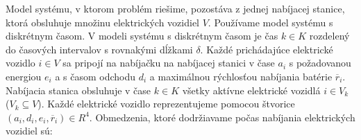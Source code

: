 Model systému, v ktorom problém riešime, pozostáva z jednej nabíjacej stanice, ktorá obsluhuje množinu elektrických vozidiel $V$.
 Používame model systému s diskrétnym časom. V modeli systému s diskrétnym časom je čas $k \in K$ rozdelený do časových intervalov s rovnakými dĺžkami $\delta$. 
 Každé prichádajúce elektrické vozidlo $i \in V$ sa pripojí na nabíjačku na nabíjacej stanici v čase $a_i$ s požadovanou energiou $e_i$ a s časom odchodu $d_i$ a maximálnou rýchlosťou nabíjania batérie $\overline{r}_{i}$. Nabíjacia stanica obsluhuje v čase $k \in K$ všetky aktívne elektrické vozidlá $i \in V_{k}$ ($V_{k} \subseteq V$). Každé elektrické vozidlo reprezentujeme pomocou štvorice $(a_{i}, d_{i}, e_{i},\overline{r}_{i}) \in R^{4}$.   \cite{chen2021smoothed, Lee2018LargeScaleAE, Li_2021} Obmedzenia, ktoré dodržiavame počas nabíjania elektrických vozidiel sú:











\renewcommand{\labelenumi}{\alph{enumi})}





